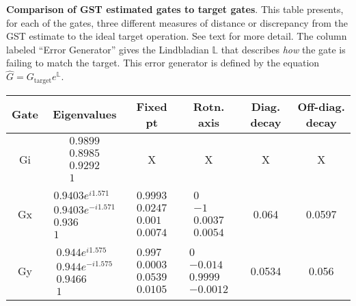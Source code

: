 {\begin{table}[h]
\begin{center}
\caption{\textbf{Comparison of GST estimated gates to target gates}.  This table presents, for each of the gates, three different measures of distance or discrepancy from the GST estimate to the ideal target operation.  See text for more detail.  The column labeled ``Error Generator'' gives the Lindbladian $\mathbb{L}$ that describes \emph{how} the gate is failing to match the target.  This error generator is defined by the equation $\hat{G} = G_{\mathrm{target}}e^{\mathbb{L}}$. \label{bestTargetGatesetVsTargetTable}}
\end{center}
\end{table}

\begin{table}[h]
\begin{center}
\begin{tabular}[l]{|c|c|c|c|c|c|}
\hline
Gate & Eigenvalues & Fixed pt & Rotn. axis & Diag. decay & Off-diag. decay \\ \hline
Gi & $ \begin{array}{c}
0.9899 \\ 
0.8985 \\ 
0.9292 \\ 
1
 \end{array} $
 & X & X & X & X \\ \hline
Gx & $ \begin{array}{c}
0.9403e^{i1.571} \\ 
0.9403e^{-i1.571} \\ 
0.936 \\ 
1
 \end{array} $
 & $ \begin{array}{c}
0.9993 \\ 
0.0247 \\ 
0.001 \\ 
0.0074
 \end{array} $
 & $ \begin{array}{c}
0 \\ 
-1 \\ 
0.0037 \\ 
0.0054
 \end{array} $
 & 0.064 & 0.0597 \\ \hline
Gy & $ \begin{array}{c}
0.944e^{i1.575} \\ 
0.944e^{-i1.575} \\ 
0.9466 \\ 
1
 \end{array} $
 & $ \begin{array}{c}
0.997 \\ 
0.0003 \\ 
0.0539 \\ 
0.0105
 \end{array} $
 & $ \begin{array}{c}
0 \\ 
-0.014 \\ 
0.9999 \\ 
-0.0012
 \end{array} $
 & 0.0534 & 0.056 \\ \hline
\end{tabular}


\end{center}
\end{table}}

